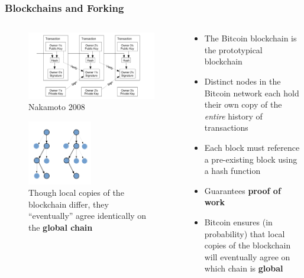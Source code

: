 \documentclass{beamer}
\begin{document}
\begin{frame}
	\frametitle{Blockchains and Forking}

	\begin{columns}{}
		\begin{column}{0.5\textwidth}
			\begin{figure}
				\centering
				\includegraphics[width=\textwidth]{nakamoto_hashes.png}
				\caption{Nakamoto 2008}
			\end{figure}

			\begin{figure}
				\centering
				\vspace{-1cm}
				\includegraphics[width=0.5\textwidth]{fork_fig.pdf}
				\caption{Though local copies of the blockchain differ,
					they ``eventually'' agree identically on the
					\textbf{global chain}}
			\end{figure}
		\end{column}

		\begin{column}{0.5\textwidth}
			\begin{itemize}
				\item The Bitcoin blockchain is the prototypical blockchain
				\item Distinct nodes in the Bitcoin network each hold their
					own copy of the \textit{entire} history of transactions
				\item Each block must reference a pre-existing block using a hash function
				\item Guarantees \textbf{proof of work}
				\item Bitcoin ensures (in probability) that local copies of the blockchain
					will eventually agree on which chain is \textbf{global}
			\end{itemize}
		\end{column}
	\end{columns}
\end{frame}
\end{document}
